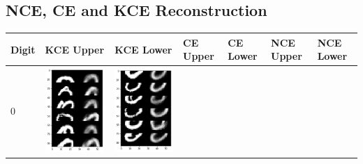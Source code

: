 \documentclass[12pt]{report} %
\begin{document}
\subsection{NCE, CE and KCE Reconstruction}
\begin{tabular}{m{0.7cm}m{2.4cm}m{2.4cm}m{2.4cm}m{2.4cm}m{2.4cm}m{2.4cm}}
	\toprule
	Digit & KCE Upper & KCE Lower & CE Upper & CE Lower & NCE Upper & NCE Lower\\
	\midrule
	0 & \includegraphics[scale=0.3]{pictures/KE_0_up.png} & \includegraphics[scale=0.3]{pictures/KE_0_down.png} &

\end{tabular}
\end{document}
